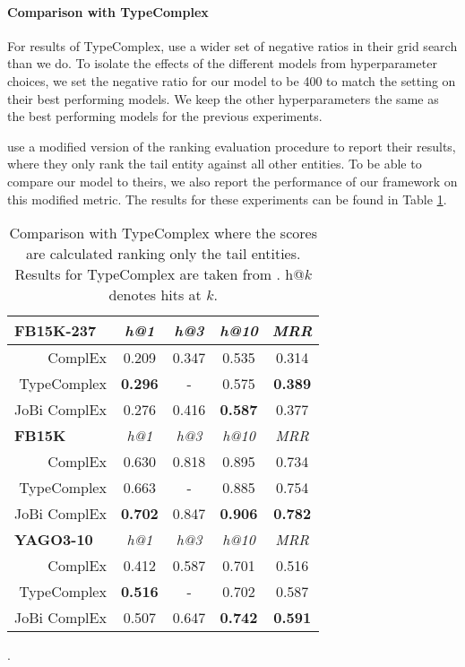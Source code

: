 \documentclass[11pt,a4paper, dvipsnames]{article}
\begin{document}
\paragraph{Comparison with TypeComplex} \label{sec:typecomplex}
For results of TypeComplex, \citet{Jain2018Type-SensitiveSupervision} use a wider set of negative ratios in their grid search than we do. To isolate the effects of the different models from hyperparameter choices, we set the negative ratio for our model to be 400 to match the setting on their best performing models. We keep the other hyperparameters the same as the best performing models for the previous experiments. 

\citet{Jain2018Type-SensitiveSupervision} use a modified version of the ranking evaluation procedure to report their results, where they only rank the tail entity against all other entities. To be able to compare our model to theirs, we also report the performance of our framework on this modified metric. The results for these experiments can be found in Table \ref{tab:typecomplex}.


\begin{table}
    \centering
    \small
    \begin{tabular}{r | c c c c  }
      \multicolumn{1}{l|}{\textbf{FB15K-237}}  & \textit{h@1} & \textit{h@3} & \textit{h@10} & \textit{MRR} \\
         \hline 
         ComplEx & 0.209 & 0.347 & 0.535 & 0.314 \\
         TypeComplex & \textbf{0.296} & - & 0.575 & \textbf{0.389} \\ 
         JoBi ComplEx  & 0.276 & 0.416  & \textbf{0.587}  & 0.377 \\
         \hline \hline  
       \multicolumn{1}{l|}{\textbf{FB15K}}  & \textit{h@1} & \textit{h@3} & \textit{h@10} & \textit{MRR} \\
         \hline 
          ComplEx & 0.630 & 0.818 & 0.895 & 0.734 \\
         TypeComplex & 0.663 & - & 0.885 & 0.754 \\ 
         JoBi ComplEx  & \textbf{0.702} & 0.847 & \textbf{0.906} & \textbf{0.782} \\
         \hline\hline
       \multicolumn{1}{l|}{\textbf{YAGO3-10}}  & \textit{h@1} & \textit{h@3} & \textit{h@10} & \textit{MRR} \\
         \hline
        ComplEx & 0.412 & 0.587 & 0.701 & 0.516 \\
         TypeComplex & \textbf{0.516} & - & 0.702 & 0.587 \\ 
         JoBi ComplEx  & 0.507 & 0.647 & \textbf{0.742}  & \textbf{0.591}
    \end{tabular}
    \caption{Comparison with TypeComplex where the scores are calculated ranking only the tail entities. Results for TypeComplex are taken from \citet{Jain2018Type-SensitiveSupervision}. h@$k$ denotes hits at $k$.}
    \label{tab:typecomplex}. 
\end{table}
\end{document}
